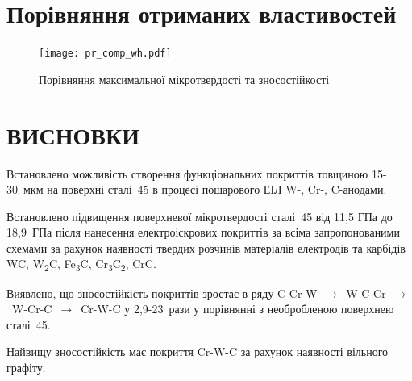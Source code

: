\documentclass[12pt,aspectratio=43,hyperref={unicode}]{beamer}
\begin{document}
\section{Порівняння отриманих властивостей}
\begin{frame}
\begin{figure}[H]
\centering
\caption{Порівняння максимальної мікротвердості та зносостійкості}
\label{fig:comp_wh}
\texttt{[image: pr\_comp\_wh.pdf]}
\end{figure}
\end{frame}


\section{ВИСНОВКИ}

\begin{frame}
\small
\vspace{-0.2cm}
\begin{exampleblock}{Встановлено можливість створення}
 функціональних покриттів товщиною 15-30~мкм на поверхні сталі~45 в процесі пошарового ЕІЛ W-, Cr-, C-анодами.
\end{exampleblock}

\begin{alertblock}{Встановлено підвищення поверхневої мікротвердості}
 сталі~45 від 11,5 ГПа до 18,9~ГПа після нанесення електроіскрових покриттів за всіма запропонованими схемами за рахунок наявності твердих розчинів матеріалів електродів та карбідів WC, W\textsubscript{2}C, Fe\textsubscript{3}C, Cr\textsubscript{3}C\textsubscript{2}, CrC.
\end{alertblock}

\begin{alertblock}{Виявлено, що зносостійкість покриттів}
зростає в ряду C-Cr-W~$\rightarrow$~W-C-Cr~$\rightarrow$~W-Cr-C~$\rightarrow$~Cr-W-C у 2,9-23~рази у порівнянні з необробленою поверхнею сталі~45.

Найвищу зносостійкість має покриття Cr-W-C за рахунок наявності вільного графіту.

\end{alertblock}
\end{frame}
\end{document}
